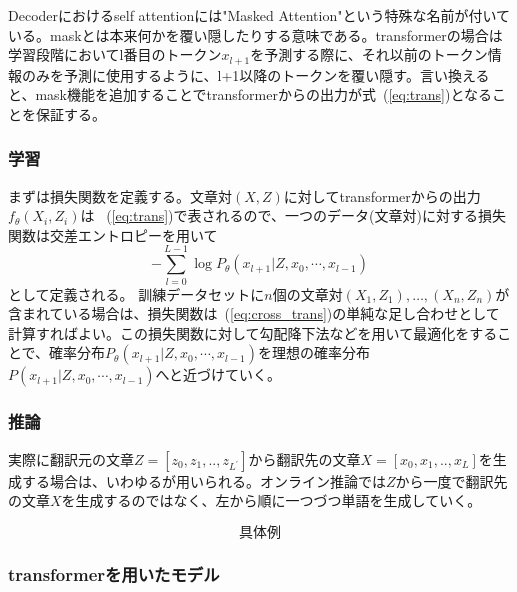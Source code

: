Decoderにおけるself attentionには"Masked Attention"という特殊な名前が付いている。maskとは本来何かを覆い隠したりする意味である。transformerの場合は学習段階においてl番目のトークン$x_{l+1}$を予測する際に、それ以前のトークン情報のみを予測に使用するように、l+1以降のトークンを覆い隠す。言い換えると、mask機能を追加することでtransformerからの出力が式~(\ref{eq:trans})となることを保証する。

\subsubsection{学習}

まずは損失関数を定義する。文章対$(X, Z)$に対してtransformerからの出力$f_\theta(X_i, Z_i)$は
~(\ref{eq:trans})で表されるので、一つのデータ(文章対)に対する損失関数は交差エントロピーを用いて
\begin{equation}
  \label{eq:cross_trans}
  - \sum_{l=0}^{L-1} \log P_\theta(x_{l+1} | Z, x_0, \cdots, x_{l-1} )
\end{equation}
として定義される。
  \label{eq:cross_trans}
訓練データセットに$n$個の文章対$(X_1, Z_1),\ldots, (X_n, Z_n)$が含まれている場合は、損失関数は~(\ref{eq:cross_trans})の単純な足し合わせとして計算すればよい。この損失関数に対して勾配降下法などを用いて最適化をすることで、確率分布$P_\theta(x_{l+1} | Z, x_0, \cdots, x_{l-1} )$を理想の確率分布$P(x_{l+1} | Z, x_0, \cdots, x_{l-1} )$へと近づけていく。 

\subsubsection{推論}
実際に翻訳元の文章$Z = [z_0, z_1, .., z_{L^\prime}]$から翻訳先の文章$X = [x_0, x_1, .., x_{L}]$を生成する場合は、いわゆるが用いられる。オンライン推論では$Z$から一度で翻訳先の文章$X$を生成するのではなく、左から順に一つづつ単語を生成していく。


\begin{equation*}
  \text{具体例}
\end{equation*}


\subsubsection{transformerを用いたモデル}
